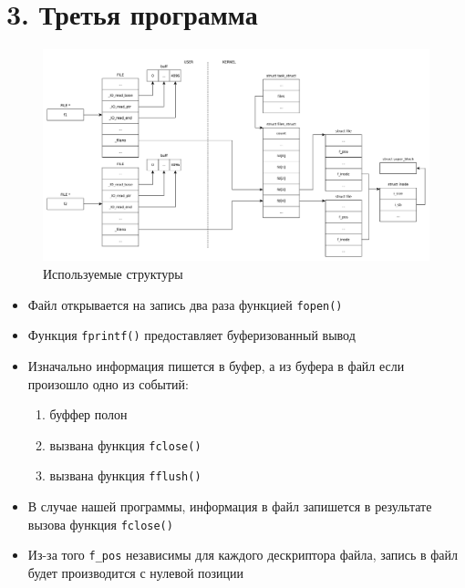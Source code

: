 \clearpage

\section*{3. Третья программа}

\begin{figure}[h!btp]
	\centering
	\includegraphics[width=470pt]{inc/scheme3.pdf}
	\caption{Используемые структуры}
	\label{fig:scheme3}	
\end{figure}

\begin{itemize}
	\item Файл открывается на запись два раза функцией \texttt{fopen()}

	\item Функция \texttt{fprintf()} предоставляет буферизованный вывод

	\item Изначально информация пишется в буфер, а из буфера в файл если произошло одно из
	событий:
	\begin{enumerate}
		\item буффер полон
		\item вызвана функция \texttt{fclose()}
		\item вызвана функция \texttt{fflush()}
	\end{enumerate}

	\item В случае нашей программы, информация в файл запишется в результате вызова функция \texttt{fclose()}

	\item Из-за того \texttt{f\_pos} независимы для каждого дескриптора файла, запись в файл будет производится с нулевой позиции
\end{itemize}

\clearpage

